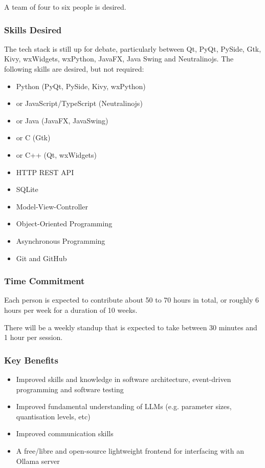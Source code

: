 \documentclass[11pt,fleqn]{article}
\begin{document}
A team of four to six people is desired.

\subsubsection*{Skills Desired}

The tech stack is still up for debate, particularly between Qt, PyQt, PySide, Gtk, Kivy, wxWidgets, wxPython, JavaFX, Java Swing and Neutralinojs.  The following skills are desired, but not required:

\begin{multicols}{2}
\begin{itemize}
    \item Python (PyQt, PySide, Kivy, wxPython)
    \item or JavaScript/TypeScript (Neutralinojs)
    \item or Java (JavaFX, JavaSwing)
    \item or C (Gtk)
    \item or C++ (Qt, wxWidgets)
    \item HTTP REST API
    \item SQLite
    \item Model-View-Controller
    \item Object-Oriented Programming
    \item Asynchronous Programming
    \item Git and GitHub
\end{itemize}
\end{multicols}

\subsubsection*{Time Commitment}

Each person is expected to contribute about 50 to 70 hours in total, or roughly 6 hours per week for a duration of 10 weeks.

There will be a weekly standup that is expected to take between 30 minutes and 1 hour per session.

\newpage

\subsubsection*{Key Benefits}

\begin{itemize}
    \item Improved skills and knowledge in software architecture, event-driven programming and software testing
    \item Improved fundamental understanding of LLMs (e.g. parameter sizes, quantisation levels, etc)
    \item Improved communication skills
    \item A free/libre and open-source lightweight frontend for interfacing with an Ollama server
\end{itemize}
\end{document}
